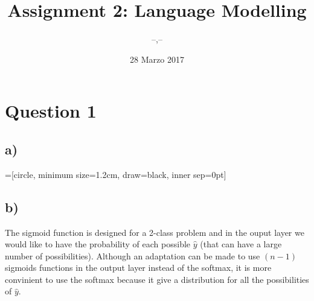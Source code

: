 \documentclass{article}
\author{--,--}
\date{28 Marzo 2017}
\title{Assignment 2: Language Modelling}
\begin{document}
\maketitle
\section{Question 1}

\subsection*{a)}
=[circle, minimum size=1.2cm, draw=black, inner sep=0pt]
\begin{center}
\end{center}

\subsection*{b)}

The sigmoid function is designed for a 2-class problem and in the ouput layer we would like to have the probability of each possible $\widehat{y}$ (that can have a large number of possibilities). Although an adaptation can be made to use $(n-1)$ sigmoids functions in the output layer instead of the softmax, it is more convinient to use the softmax because it give a distribution for all the possibilities of $\widehat{y}$.
\end{document}
